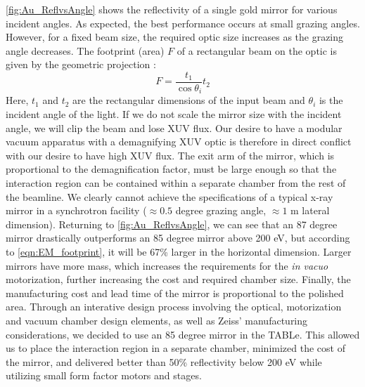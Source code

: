 \cref{fig:Au_ReflvsAngle} shows the reflectivity of a single gold mirror for various incident angles. As expected, the best performance occurs at small grazing angles. However, for a fixed beam size, the required optic size increases as the grazing angle decreases. The footprint (area) $F$ of a rectangular beam on the optic is given by the geometric projection \cite{gibaudSpecularReflectivitySmooth2009}:
\begin{equation}
F = \frac{t_1}{\cos \theta_i}t_2
\label{eqn:EM_footprint}
\end{equation}
Here, $t_1$ and $t_2$ are the rectangular dimensions of the input beam and $\theta_i$ is the incident angle of the light. If we do not scale the mirror size with the incident angle, we will clip the beam and lose XUV flux. Our desire to have a modular vacuum apparatus with a demagnifying XUV optic is therefore in direct conflict with our desire to have high XUV flux. The exit arm of the mirror, which is proportional to the demagnification factor, must be large enough so that the interaction region can be contained within a separate chamber from the rest of the beamline. We clearly cannot achieve the specifications of a typical x-ray mirror in a synchrotron facility ($\approx 0.5$ degree grazing angle, $\approx 1$ m lateral dimension). Returning to \cref{fig:Au_ReflvsAngle}, we can see that an 87 degree mirror drastically outperforms an 85 degree mirror above 200 eV, but according to \cref{eqn:EM_footprint}, it will be 67\% larger in the horizontal dimension. Larger mirrors have more mass, which increases the requirements for the \textit{in vacuo} motorization, further increasing the cost and required chamber size. Finally, the manufacturing cost and lead time of the mirror is proportional to the polished area. Through an interative design process involving the optical, motorization and vacuum chamber design elements, as well as Zeiss' manufacturing considerations, we decided to use an 85 degree mirror in the TABLe. This allowed us to place the interaction region in a separate chamber, minimized the cost of the mirror, and delivered better than 50\% reflectivity below 200 eV while utilizing small form factor motors and stages. 

